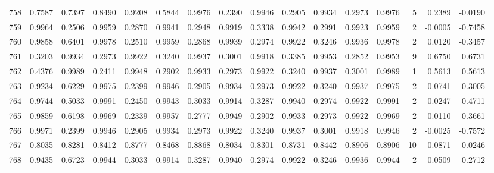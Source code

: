 \begin{tabular}{lrrrrrrrrrrrrrrr}
758 &      0.7587 &  0.7397 &  0.8490 &  0.9208 &  0.5844 &  0.9976 &  0.2390 &  0.9946 &  0.2905 &  0.9934 &   0.2973 &     0.9976 &      5 &                    0.2389 &                    -0.0190 \\
759 &      0.9964 &  0.2506 &  0.9959 &  0.2870 &  0.9941 &  0.2948 &  0.9919 &  0.3338 &  0.9942 &  0.2991 &   0.9923 &     0.9959 &      2 &                   -0.0005 &                    -0.7458 \\
760 &      0.9858 &  0.6401 &  0.9978 &  0.2510 &  0.9959 &  0.2868 &  0.9939 &  0.2974 &  0.9922 &  0.3246 &   0.9936 &     0.9978 &      2 &                    0.0120 &                    -0.3457 \\
761 &      0.3203 &  0.9934 &  0.2973 &  0.9922 &  0.3240 &  0.9937 &  0.3001 &  0.9918 &  0.3385 &  0.9953 &   0.2852 &     0.9953 &      9 &                    0.6750 &                     0.6731 \\
762 &      0.4376 &  0.9989 &  0.2411 &  0.9948 &  0.2902 &  0.9933 &  0.2973 &  0.9922 &  0.3240 &  0.9937 &   0.3001 &     0.9989 &      1 &                    0.5613 &                     0.5613 \\
763 &      0.9234 &  0.6229 &  0.9975 &  0.2399 &  0.9946 &  0.2905 &  0.9934 &  0.2973 &  0.9922 &  0.3240 &   0.9937 &     0.9975 &      2 &                    0.0741 &                    -0.3005 \\
764 &      0.9744 &  0.5033 &  0.9991 &  0.2450 &  0.9943 &  0.3033 &  0.9914 &  0.3287 &  0.9940 &  0.2974 &   0.9922 &     0.9991 &      2 &                    0.0247 &                    -0.4711 \\
765 &      0.9859 &  0.6198 &  0.9969 &  0.2339 &  0.9957 &  0.2777 &  0.9949 &  0.2902 &  0.9933 &  0.2973 &   0.9922 &     0.9969 &      2 &                    0.0110 &                    -0.3661 \\
766 &      0.9971 &  0.2399 &  0.9946 &  0.2905 &  0.9934 &  0.2973 &  0.9922 &  0.3240 &  0.9937 &  0.3001 &   0.9918 &     0.9946 &      2 &                   -0.0025 &                    -0.7572 \\
767 &      0.8035 &  0.8281 &  0.8412 &  0.8777 &  0.8468 &  0.8868 &  0.8034 &  0.8301 &  0.8731 &  0.8442 &   0.8906 &     0.8906 &     10 &                    0.0871 &                     0.0246 \\
768 &      0.9435 &  0.6723 &  0.9944 &  0.3033 &  0.9914 &  0.3287 &  0.9940 &  0.2974 &  0.9922 &  0.3246 &   0.9936 &     0.9944 &      2 &                    0.0509 &                    -0.2712 \\

\end{tabular}

